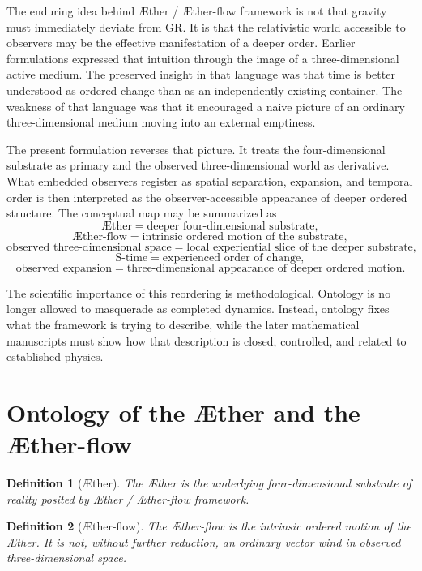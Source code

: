 \documentclass[11pt]{article}
\newcommand{\Aether}{\AE{}ther}
\newcommand{\Aflow}{\AE{}ther-flow}
\newcommand{\TheoryProgram}{\Aether{} / \Aflow{} framework}
\newtheorem{definition}{Definition}
\begin{document}
The enduring idea behind \TheoryProgram{} is not that gravity must immediately deviate from GR. It is that the relativistic world accessible to observers may be the effective manifestation of a deeper order. Earlier formulations expressed that intuition through the image of a three-dimensional active medium. The preserved insight in that language was that time is better understood as ordered change than as an independently existing container. The weakness of that language was that it encouraged a naive picture of an ordinary three-dimensional medium moving into an external emptiness.

The present formulation reverses that picture. It treats the four-dimensional substrate as primary and the observed three-dimensional world as derivative. What embedded observers register as spatial separation, expansion, and temporal order is then interpreted as the observer-accessible appearance of deeper ordered structure. The conceptual map may be summarized as
\[
\text{\Aether{}}
=
\text{deeper four-dimensional substrate},
\]
\[
\text{\Aflow{}}
=
\text{intrinsic ordered motion of the substrate},
\]
\[
\text{observed three-dimensional space}
=
\text{local experiential slice of the deeper substrate},
\]
\[
\text{S-time}
=
\text{experienced order of change},
\]
\[
\text{observed expansion}
=
\text{three-dimensional appearance of deeper ordered motion}.
\]

The scientific importance of this reordering is methodological. Ontology is no longer allowed to masquerade as completed dynamics. Instead, ontology fixes what the framework is trying to describe, while the later mathematical manuscripts must show how that description is closed, controlled, and related to established physics.

\section{Ontology of the \Aether{} and the \Aflow{}}

\begin{definition}[\Aether{}]
The \Aether{} is the underlying four-dimensional substrate of reality posited by \TheoryProgram{}.
\end{definition}

\begin{definition}[\Aflow{}]
The \Aflow{} is the intrinsic ordered motion of the \Aether{}. It is not, without further reduction, an ordinary vector wind in observed three-dimensional space.
\end{definition}
\end{document}
